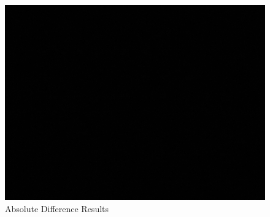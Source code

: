		\begin{figure}[H]
			\includegraphics[width=\linewidth]{figsrc/simulation/normal/akaze_absdiff.png}
			\caption{Absolute Difference Results}
			\label{fig:siftAbsDifference}
		\end{figure}
